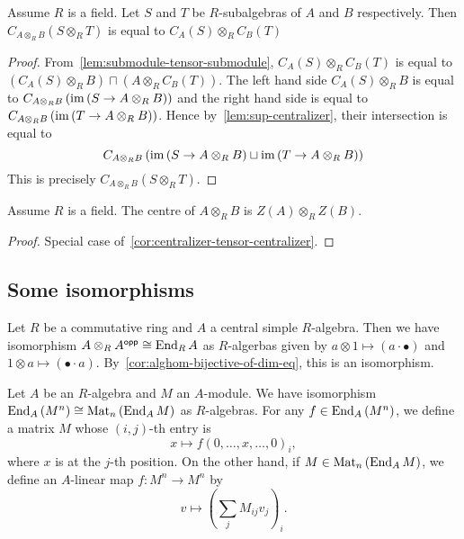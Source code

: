 \begin{corollary}\label{cor:centralizer-tensor-centralizer}
  Assume $R$ is a field. Let $S$ and $T$ be $R$-subalgebras of $A$ and $B$
  respectively. Then $C_{A\otimes_{R}B}\left(S\otimes_{R}T\right)$ is equal to
  $C_{A}(S)\otimes_{R}C_{B}(T)$ \leanok {}
\end{corollary}
\begin{proof}
  From~\cref{lem:submodule-tensor-submodule}, $C_{A}(S)\otimes_{R}C_{B}(T)$ is
  equal to
  $\left(C_{A}(S)\otimes_{R} B\right)\sqcap \left(A\otimes_{R}C_{B}(T)\right)$.
  The left hand side $C_{A}(S)\otimes_{R} B$ is equal to
  $C_{A\otimes_{R}B}\left(\operatorname{im}\left(S\to A\otimes_{R}B\right)\right)$ and the
  right hand side is equal to
  $C_{A\otimes_{R}B}\left(\operatorname{im}\left(T\to A\otimes_{R}B\right)\right)$. Hence
  by~\cref{lem:sup-centralizer}, their intersection is equal to
  \[C_{A\otimes_{R}B}\left(\operatorname{im}\left(S\to A\otimes_{R} B\right)\sqcup \operatorname{im}\left(T\to A\otimes_{R}B\right)\right)\]
  This is precisely $C_{A\otimes_{R}B}\left(S\otimes_{R}T\right)$.
\end{proof}

\begin{corollary}
  \label{cor:center-tensor-center}
  Assume $R$ is a field. The centre of $A\otimes_{R} B$ is
  $Z\left(A\right)\otimes_{R}Z\left(B\right)$. \leanok
\end{corollary}
\begin{proof}
  Special case of~\cref{cor:centralizer-tensor-centralizer}.
\end{proof}

\subsection{Some isomorphisms}

\begin{construction}
  \label{con:self-tensor-opp-iso-end}
  Let $R$ be a commutative ring and $A$ a central simple $R$-algebra. Then we
  have isomorphism $A\otimes_{R}A^{\mathsf{opp}} \cong \operatorname{End}_{R}A$ as $R$-algerbas given
  by $a\otimes 1 \mapsto (a\cdot\bullet)$ and
  $1\otimes a \mapsto (\bullet\cdot a)$.
  By~\cref{cor:alghom-bijective-of-dim-eq}, this is an isomorphism.
\end{construction}

\begin{construction}
  \label{con:end-vec-iso-matrix}
  Let $A$ be an $R$-algebra and $M$ an $A$-module. We have isomorphism
  $\operatorname{End}_{A}\left(M^{n}\right)\cong \operatorname{Mat}_{n}\left(\operatorname{End}_{A}M\right)$ as
  $R$-algebras. For any $f \in \operatorname{End}_{A}\left(M^{n}\right)$, we define a matrix
  $M$ whose $(i,j)$-th entry is
  \[
    x \mapsto f\left(0,\dots,x,\dots,0\right)_{i},
  \]
  where $x$ is at the $j$-th position. On the other hand, if
  $M \in \operatorname{Mat}_{n}\left(\operatorname{End}_{A}M\right)$, we define an $A$-linear map
  $f : M^{n}\to M^{n}$ by
  \[
    v \mapsto \left(\sum_{j}M_{ij}v_{j}\right)_{i}.
  \]
  \leanok {}
\end{construction}
